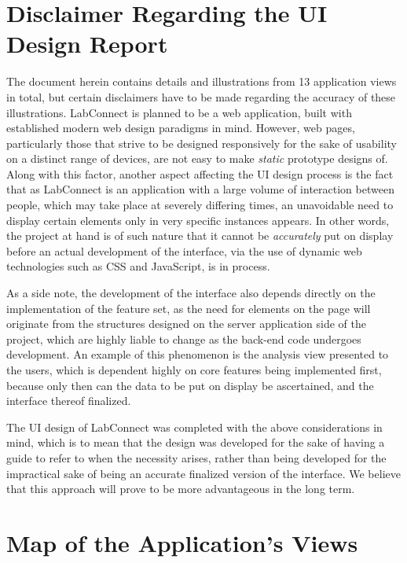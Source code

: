 \documentclass[a4paper, 12pt]{article}
\begin{document}
    \section{Disclaimer Regarding the UI Design Report}
    
    The document herein contains details and illustrations from 13 application views in total, but certain disclaimers have to be made
    regarding the accuracy of these illustrations.
    LabConnect is planned to be a web application, built with established modern web design paradigms in mind. However, web pages,
    particularly those that strive to be designed responsively for the sake of usability on a distinct range of devices, are
    not easy to make \emph{static} prototype designs of. Along with this factor, another aspect affecting the UI design process is the fact
    that as LabConnect is an application with a large volume of interaction between people, which may take place at severely
    differing times, an unavoidable need to display certain elements only in very specific instances appears. In other words, the project
    at hand is of such nature that it cannot be \emph{accurately} put on display before an actual development of the interface, via
    the use of dynamic web technologies such as CSS and JavaScript, is in process. 

    As a side note, the development of the interface also depends directly on the implementation of the feature set,
    as the need for elements on the page will originate from the structures designed on the server application side of the project, which
    are highly liable to change as the back-end code undergoes development. An example of this phenomenon is the analysis view presented to the users,
    which is dependent highly on core features being implemented first, because only then can the data to be put on display be ascertained,
    and the interface thereof finalized.
    
    The UI design of LabConnect was completed with the above considerations in mind, which is to mean that the design was developed
    for the sake of having a guide to refer to when the necessity arises, rather than being developed for the impractical sake of being an accurate
    finalized version of the interface. We believe that this approach will prove to be more advantageous in the long term.
    
    \pagebreak
    
    \section{Map of the Application's Views}
    
\end{document}
